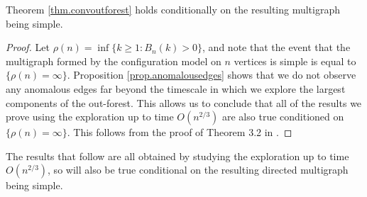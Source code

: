 


\begin{corollary}
 Theorem \ref{thm.convoutforest} holds conditionally on the resulting multigraph being simple. 
\end{corollary}
\begin{proof}
Let $\rho(n)=\inf\{k\geq 1:B_n(k)>0\}$, and note that the event that the multigraph formed by the configuration model on $n$ vertices is simple is equal to $\{\rho(n)=\infty\}$. Proposition \ref{prop.anomalousedges} shows that we do not observe any anomalous edges far beyond the timescale in which we explore the largest components of the out-forest. This allows us to conclude that all of the results we prove using the exploration up to time $O(n^{2/3})$ are also true conditioned on $\{\rho(n)=\infty\}$. This follows from the proof of Theorem 3.2 in \cite{josephComponentSizesCritical2014}.
\end{proof}
The results that follow are all obtained by studying the exploration up to time $O(n^{2/3})$, so will also be true conditional on the resulting directed multigraph being simple.

